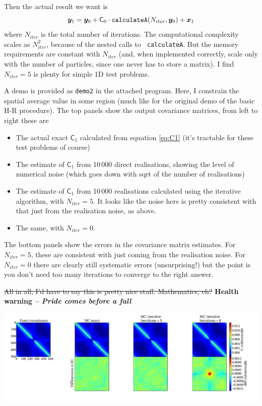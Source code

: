 \documentclass[11pt,a4paper,preprint]{aastex}
\newcommand{\bmath}[1]{\ensuremath{\bm{#1}}}
\renewcommand{\vec}[1]{\bmath{#1}}
\begin{document}
Then the actual result we want is
\begin{equation}
\vec{y}_1 = \vec{y}_0 + \mathsf{C}_0 \cdot {\tt
  calculateA}(N_{iter},\vec{y}_0) + \vec{x}_1
\end{equation}
where $N_{iter}$ is the total number of iterations. The computational
complexity scales as $N_{iter}^2$, because of the nested calls to {\tt
  calculateA}. But the memory requirements are constant with
$N_{iter}$ (and, when implemented correctly, scale only with the
number of particles, since one never has to store a matrix). I find
$N_{iter}=5$ is plenty for simple 1D test problems.

A demo is provided as {\tt demo2} in the attached program. Here, I
constrain the spatial average value in some region (much like for the
original demo of the basic H-R procedure). The top panels show the
output covariance matrices, from left to right these are
\begin{itemize}
\item The actual exact $\mathsf{C}_1$ calculated from equation
  \eqref{eq:C1} (it's tractable for these test problems of course)
\item The estimate of $\mathsf{C}_1$ from 10\,000 direct realisations,
  showing the level of numerical noise (which goes down with sqrt of
  the number of realisations)
\item The estimate of $\mathsf{C}_1$ from 10\,000 realisations
  calculated using the iterative algorithm, with $N_{iter}=5$. It
  looks like the noise here is pretty consistent with that just from
  the realisation noise, as above.
\item The same, with $N_{iter}=0$.
\end{itemize}

The bottom panels show the errors in the covariance matrix
estimates. For $N_{iter}=5$, these are consistent with just coming
from the realisation noise. For $N_{iter}=0$ there are clearly still
systematic errors (unsurprising!) but the point is you don't need too
many iterations to converge to the right answer.

\st{All in all, I'd have to say this is pretty nice
  stuff. Mathematics, eh?} {\bf Health warning -- \it Pride comes before a fall}

\begin{center}
\includegraphics[width=1.1\textwidth]{figs/HR-approx-demo.pdf}
\end{center}
\end{document}
